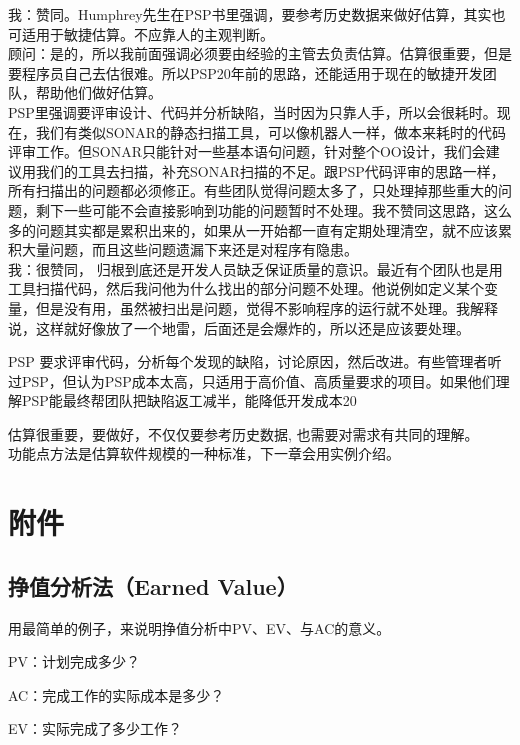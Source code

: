 {\begin{minipage}[t]{0.97\columnwidth}
我：赞同。Humphrey先生在PSP书里强调，要参考历史数据来做好估算，其实也可适用于敏捷估算。不应靠人的主观判断。\\
顾问：是的，所以我前面强调必须要由经验的主管去负责估算。估算很重要，但是要程序员自己去估很难。所以PSP20年前的思路，还能适用于现在的敏捷开发团队，帮助他们做好估算。\\
PSP里强调要评审设计、代码并分析缺陷，当时因为只靠人手，所以会很耗时。现在，我们有类似SONAR的静态扫描工具，可以像机器人一样，做本来耗时的代码评审工作。但SONAR只能针对一些基本语句问题，针对整个OO设计，我们会建议用我们的工具去扫描，补充SONAR扫描的不足。跟PSP代码评审的思路一样，所有扫描出的问题都必须修正。有些团队觉得问题太多了，只处理掉那些重大的问题，剩下一些可能不会直接影响到功能的问题暂时不处理。我不赞同这思路，这么多的问题其实都是累积出来的，如果从一开始都一直有定期处理清空，就不应该累积大量问题，而且这些问题遗漏下来还是对程序有隐患。\\
我：很赞同，
归根到底还是开发人员缺乏保证质量的意识。最近有个团队也是用工具扫描代码，然后我问他为什么找出的部分问题不处理。他说例如定义某个变量，但是没有用，虽然被扫出是问题，觉得不影响程序的运行就不处理。我解释说，这样就好像放了一个地雷，后面还是会爆炸的，所以还是应该要处理。
\strut
\end{minipage}}

PSP 要求评审代码，分析每个发现的缺陷，讨论原因，然后改进。有些管理者听过PSP，但认为PSP成本太高，只适用于高价值、高质量要求的项目。如果他们理解PSP能最终帮团队把缺陷返工减半，能降低开发成本20%

估算很重要，要做好，不仅仅要参考历史数据, 也需要对需求有共同的理解。\\
功能点方法是估算软件规模的一种标准，下一章会用实例介绍。

\hypertarget{ux9644ux4ef6}{%
\section{附件}\label{ux9644ux4ef6}}

\hypertarget{ux6323ux503cux5206ux6790ux6cd5earned-value}{%
\subsection{挣值分析法（Earned
Value）}\label{ux6323ux503cux5206ux6790ux6cd5earned-value}}

用最简单的例子，来说明挣值分析中PV、EV、与AC的意义。

\begin{description}
\tightlist
\item[]
PV：计划完成多少？
\item[]
AC：完成工作的实际成本是多少？
\item[]
EV：实际完成了多少工作？
\end{description}

